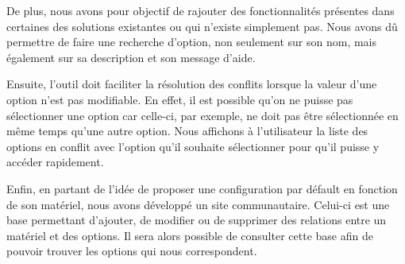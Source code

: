 \documentclass[16pts]{report}
\begin{document}
De plus, nous avons pour objectif de rajouter des fonctionnalités présentes dans certaines des solutions existantes ou qui n'existe simplement pas. Nous avons dû permettre de faire une recherche d'option, non seulement sur son nom, mais également sur sa description et son message d'aide.

Ensuite, l'outil doit faciliter la résolution des conflits lorsque la valeur d'une option n'est pas modifiable. En effet, il est possible qu'on ne puisse pas sélectionner une option car celle-ci, par exemple, ne doit pas être sélectionnée en même temps qu'une autre option. Nous affichons à l'utilisateur la liste des options en conflit avec l'option qu'il souhaite sélectionner pour qu'il puisse y accéder rapidement.

Enfin, en partant de l'idée de proposer une configuration par défault en fonction de son matériel, nous avons développé un site communautaire. Celui-ci est une base permettant d'ajouter, de modifier ou de supprimer des relations entre un matériel et des options. Il sera alors possible de consulter cette base afin de pouvoir trouver les options qui nous correspondent.
\end{document}
